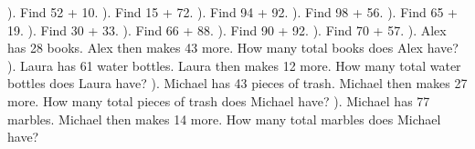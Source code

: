 \documentclass{article}%
\begin{document}
\newline%
). Find 52 + 10.%
\newline%
\newline%
). Find 15 + 72.%
\newline%
\newline%
). Find 94 + 92.%
\newline%
\newline%
). Find 98 + 56.%
\newline%
\newline%
). Find 65 + 19.%
\newline%
\newline%
). Find 30 + 33.%
\newline%
\newline%
). Find 66 + 88.%
\newline%
\newline%
). Find 90 + 92.%
\newline%
\newline%
). Find 70 + 57.%
\newline%
\newline%
). Alex has 28 books. Alex then makes 43 more. How many total books does Alex have?%
\newline%
\newline%
). Laura has 61 water bottles. Laura then makes 12 more. How many total water bottles does Laura have?%
\newline%
\newline%
). Michael has 43 pieces of trash. Michael then makes 27 more. How many total pieces of trash does Michael have?%
\newline%
\newline%
). Michael has 77 marbles. Michael then makes 14 more. How many total marbles does Michael have?%
\newline%
\newline%
\newline%
\end{document}
